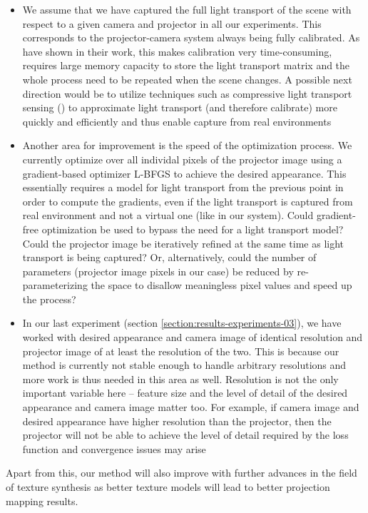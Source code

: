 \begin{itemize}
    \item We assume that we have captured the full light transport of the scene with respect to a given camera and projector in all our experiments. This corresponds to the projector-camera system always being fully calibrated. As \citet{Wetzstein2007} have shown in their work, this makes calibration very time-consuming, requires large memory capacity to store the light transport matrix and the whole process need to be repeated when the scene changes. A possible next direction would be to utilize techniques such as compressive light transport sensing (\citet{Peers2009}) to approximate light transport (and therefore calibrate) more quickly and efficiently and thus enable capture from real environments
    \item Another area for improvement is the speed of the optimization process. We currently optimize over all individal pixels of the projector image using a gradient-based optimizer L-BFGS to achieve the desired appearance. This essentially requires a model for light transport from the previous point in order to compute the gradients, even if the light transport is captured from real environment and not a virtual one (like in our system). Could gradient-free optimization be used to bypass the need for a light transport model? Could the projector image be iteratively refined at the same time as light transport is being captured? Or, alternatively, could the number of parameters (projector image pixels in our case) be reduced by re-parameterizing the space to disallow meaningless pixel values and speed up the process?
    \item In our last experiment (section \ref{section:results-experiments-03}), we have worked with desired appearance and camera image of identical resolution and projector image of at least the resolution of the two. This is because our method is currently not stable enough to handle arbitrary resolutions and more work is thus needed in this area as well. Resolution is not the only important variable here -- feature size and the level of detail of the desired appearance and camera image matter too. For example, if camera image and desired appearance have higher resolution than the projector, then the projector will not be able to achieve the level of detail required by the loss function and convergence issues may arise
\end{itemize}

Apart from this, our method will also improve with further advances in the field of texture synthesis as better texture models will lead to better projection mapping results.